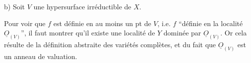 
b) Soit $V$ une hypersurface irréductible de $X$.

Pour voir que $f$ est définie en au moins un pt de $V$,  i.e. $f$ ``définie en la localité $\underline O_{(V)}$'', il faut montrer qu'il existe une localité de $Y$ dominée par $\underline O_{(V)}$. Or cela résulte de la définition abstraite des variétés complètes, et du fait que $\underline O_{(V)}$ est un anneau de valuation.

